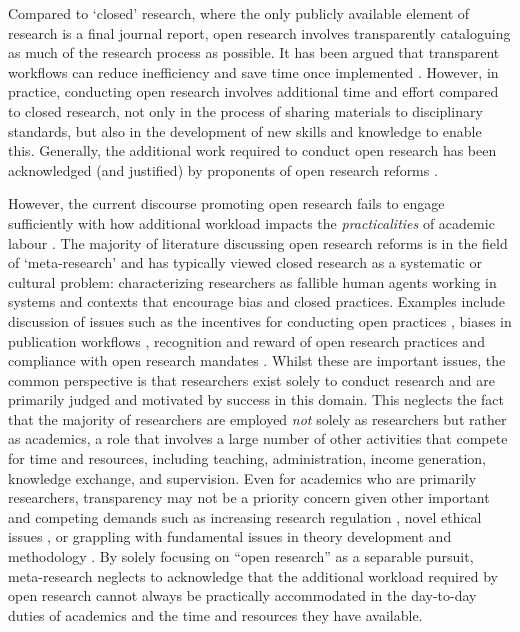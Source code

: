 \documentclass[meta, authordate]{jote-new-article}
\begin{document}
Compared to ‘closed’ research, where the only publicly available element of research is a final journal report, open research involves transparently cataloguing as much of the research process as possible. It has been argued that transparent workflows can reduce inefficiency and save time once implemented \parencites{Lowndes2017}. However, in practice, conducting open research involves additional time and effort compared to closed research, not only in the process of sharing materials to disciplinary standards, but also in the development of new skills and knowledge to enable this. Generally, the additional work required to conduct open research has been acknowledged (and justified) by proponents of open research reforms \parencites[e.g.][]{Allen2019}{Robson2021}{Scheliga2014}{Stewart2021}.



However, the current discourse promoting open research fails to engage sufficiently with how additional workload impacts the \emph{practicalities} of academic labour \parencites{Callard2022}. The majority of literature discussing open research reforms is in the field of ‘meta-research’ and has typically viewed closed research as a systematic or cultural problem: characterizing researchers as fallible human agents working in systems and contexts that encourage bias and closed practices. Examples include discussion of issues such as the incentives for conducting open practices \parencites{Nosek2012}, biases in publication workflows \parencites{Chambers2022}, recognition and reward of open research practices \parencites{Munafò2019} and compliance with open research mandates \parencites{Gabelica2022}. Whilst these are important issues, the common perspective is that researchers exist solely to conduct research and are primarily judged and motivated by success in this domain. This neglects the fact that the majority of researchers are employed \emph{not} solely as researchers but rather as academics, a role that involves a large number of other activities that compete for time and resources, including teaching, administration, income generation, knowledge exchange, and supervision. Even for academics who are primarily researchers, transparency may not be a priority concern given other important and competing demands such as increasing research regulation \parencites{Stewart2008}, novel ethical issues \parencites{Havard2012}, or grappling with fundamental issues in theory development \parencites{Eronen2021} and methodology \parencites{Uher2023}. By solely focusing on “open research” as a separable pursuit, meta-research neglects to acknowledge that the additional workload required by open research cannot always be practically accommodated in the day-to-day duties of academics and the time and resources they have available.
\end{document}
